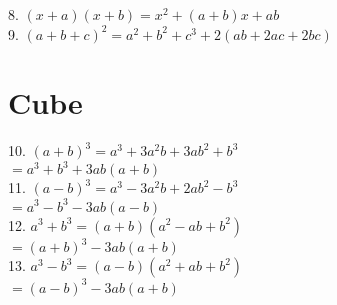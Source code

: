 \documentclass{article}
\begin{document}
8. $(x+a)(x+b) = x^2 + (a+b)x + ab$ \\ 

9. $(a+b+c)^2$\hspace{5.3mm}$ = a^2 + b^2 + c^3 + 2(ab+2ac+2bc)$\\

\section{Cube}
\hspace*{5mm}10. $(a+b)^3 $\hspace{5mm}$= a^3+3a^2b+3ab^2+b^3$\\
\hspace*{30.8mm}$=a^3+b^3+3ab(a+b)$ \\
	
11. $(a-b)^3 $\hspace{4.6mm}$= a^3 - 3a^2b+2ab^2-b^3$ \\ 
\hspace*{30.8mm}$=a^3-b^3-3ab(a-b)$ \\
 
12. $a^3 + b^3$\hspace{5.8mm}$ = (a+b)(a^2-ab+b^2)$\\ 
\hspace*{30.5mm}$=(a+b)^3 - 3ab(a+b)$\\
\hspace*{5mm}13. $a^3-b^3 $\hspace{5.8mm}$= (a-b)(a^2+ab+b^2)$\\
\hspace*{30.5mm}$=(a-b)^3 - 3ab(a+b)$\\  
\end{document}
